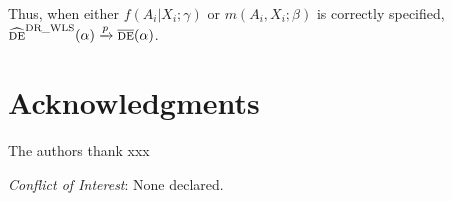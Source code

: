\documentclass[oupdraft]{bio}
\begin{document}
Thus, when either $f(A_i|X_i;\gamma)$ or $m(A_i,X_i;\beta)$ is correctly specified, $\widehat{\textsc{de}}^{\text{DR\_WLS}}(\alpha)\xrightarrow{p}\overline{\textsc{de}}(\alpha)$.


\section*{Acknowledgments}

The authors thank xxx

{\it Conflict of Interest}: None declared.




%


\end{document}
